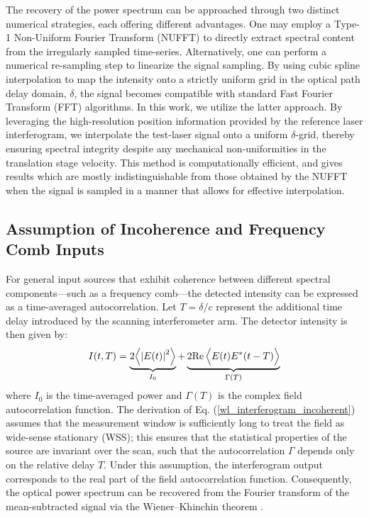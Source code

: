 \documentclass[8pt,a4paper]{report}
\begin{document}
	The recovery of the power spectrum can be approached through two distinct numerical strategies, each offering different advantages. One may employ a Type-1 Non-Uniform Fourier Transform (NUFFT) to directly extract spectral content from the irregularly sampled time-series. Alternatively, one can perform a numerical re-sampling step to linearize the signal sampling. By using cubic spline interpolation to map the intensity onto a strictly uniform grid in the optical path delay domain, $\delta$, the signal becomes compatible with standard Fast Fourier Transform (FFT) algorithms. In this work, we utilize the latter approach. By leveraging the high-resolution position information provided by the reference laser interferogram, we interpolate the test-laser signal onto a uniform $\delta$-grid, thereby ensuring spectral integrity despite any mechanical non-uniformities in the translation stage velocity. This method is computationally efficient, and gives results which are mostly indistinguishable from those obtained by the NUFFT when the signal is sampled in a manner that allows for effective interpolation.
	
	\subsection{Assumption of Incoherence and Frequency Comb Inputs}
	
	For general input sources that exhibit coherence between different spectral components—such as a frequency comb—the detected intensity can be expressed as a time-averaged autocorrelation. Let $T = \delta/c$ represent the additional time delay introduced by the scanning interferometer arm. The detector intensity is then given by:
	\begin{equation}
		I(t, T) = \underbrace{2\Bigl<  \left|E(t)\right|^2 \Bigr>}_{I_0} + \underbrace{2 \mathrm{Re}\,\Bigl< E(t) E^*(t-T) \Bigr>}_{\Gamma(T)}
	\end{equation}
	where $I_0$ is the time-averaged power and $\Gamma(T)$ is the complex field autocorrelation function. The derivation of Eq. (\ref{wl_interferogram_incoherent}) assumes that the measurement window is sufficiently long to treat the field as wide-sense stationary (WSS); this ensures that the statistical properties of the source are invariant over the scan, such that the autocorrelation $\Gamma$ depends only on the relative delay $T$. Under this assumption, the interferogram output corresponds to the real part of the field autocorrelation function. Consequently, the optical power spectrum can be recovered from the Fourier transform of the mean-subtracted signal via the Wiener–Khinchin theorem \cite{book_born_and_wolf_princpOptics}.
	
\end{document}
